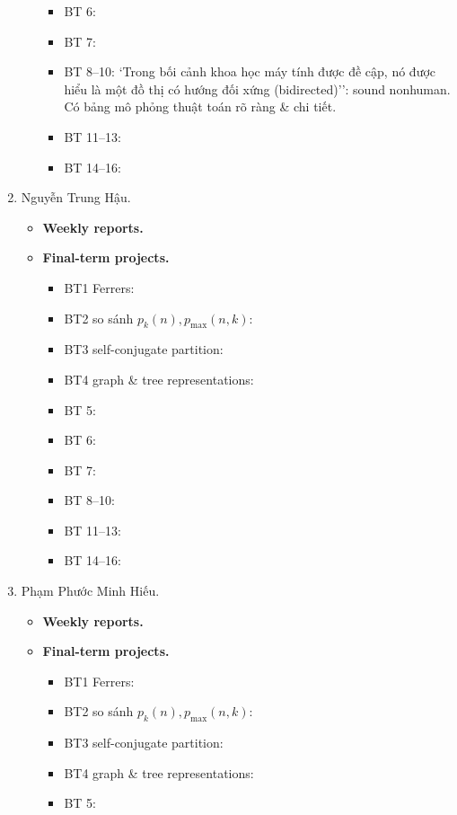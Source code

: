 \documentclass{article}
\begin{document}
\begin{enumerate}
\begin{itemize}
\begin{itemize}
            \item BT 6:
            \item BT 7:
            \item BT 8--10: `Trong bối cảnh khoa học máy tính được đề cập, nó được hiểu là một đồ thị có hướng đối xứng (bidirected)'': sound nonhuman. Có bảng mô phỏng thuật toán rõ ràng \& chi tiết.
            \item BT 11--13:
            \item BT 14--16:
        \end{itemize}
    \end{itemize}
    \item {\sc Nguyễn Trung Hậu.}
    \begin{itemize}
        \item {\bf Weekly reports.}
        \item {\bf Final-term projects.}
        \begin{itemize}
            \item BT1 Ferrers:
            \item BT2 so sánh $p_k(n),p_{\max}(n,k)$:
            \item BT3 self-conjugate partition:
            \item BT4 graph \& tree representations:
            \item BT 5:
            \item BT 6:
            \item BT 7:
            \item BT 8--10:
            \item BT 11--13:
            \item BT 14--16:
        \end{itemize}
    \end{itemize}
    \item {\sc Phạm Phước Minh Hiếu.}
    \begin{itemize}
        \item {\bf Weekly reports.}
        \item {\bf Final-term projects.}
        \begin{itemize}
            \item BT1 Ferrers:
            \item BT2 so sánh $p_k(n),p_{\max}(n,k)$:
            \item BT3 self-conjugate partition:
            \item BT4 graph \& tree representations:
            \item BT 5:

\end{itemize}
\end{itemize}
\end{enumerate}
\end{document}
